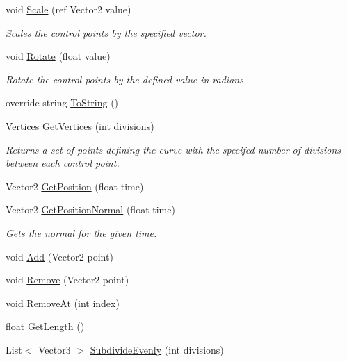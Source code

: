 \begin{DoxyCompactItemize}
void \hyperlink{class_farseer_physics_1_1_common_1_1_path_a33ade4f8312c0561d14ca16449e59cd4}{Scale} (ref Vector2 value)
\begin{DoxyCompactList}\small\item\em Scales the control points by the specified vector. \end{DoxyCompactList}\item 
void \hyperlink{class_farseer_physics_1_1_common_1_1_path_a5f4628f5869db71b8c36e6fa846536e2}{Rotate} (float value)
\begin{DoxyCompactList}\small\item\em Rotate the control points by the defined value in radians. \end{DoxyCompactList}\item 
override string \hyperlink{class_farseer_physics_1_1_common_1_1_path_a61b202f0d4f302a73d1508432c6bfa0f}{To\+String} ()
\item 
\hyperlink{class_farseer_physics_1_1_common_1_1_vertices}{Vertices} \hyperlink{class_farseer_physics_1_1_common_1_1_path_a20584c8b2eb6962d4685c7d1595faaec}{Get\+Vertices} (int divisions)
\begin{DoxyCompactList}\small\item\em Returns a set of points defining the curve with the specifed number of divisions between each control point. \end{DoxyCompactList}\item 
Vector2 \hyperlink{class_farseer_physics_1_1_common_1_1_path_afe45b457dcc1028fa00f4f2c64a3b2b5}{Get\+Position} (float time)
\item 
Vector2 \hyperlink{class_farseer_physics_1_1_common_1_1_path_a7a0612ba828150f7cbc65d18345411fe}{Get\+Position\+Normal} (float time)
\begin{DoxyCompactList}\small\item\em Gets the normal for the given time. \end{DoxyCompactList}\item 
void \hyperlink{class_farseer_physics_1_1_common_1_1_path_a0bb269a75a6d9032ceaed3e4f333318b}{Add} (Vector2 point)
\item 
void \hyperlink{class_farseer_physics_1_1_common_1_1_path_ae064a831d128bdd12dcc0e9c21db49cb}{Remove} (Vector2 point)
\item 
void \hyperlink{class_farseer_physics_1_1_common_1_1_path_a72616643f115ee1286522ec1b485c3dd}{Remove\+At} (int index)
\item 
float \hyperlink{class_farseer_physics_1_1_common_1_1_path_a22a0f5c0fbb4179e8490311ec46b1e00}{Get\+Length} ()
\item 
List$<$ Vector3 $>$ \hyperlink{class_farseer_physics_1_1_common_1_1_path_a1655182357fd942a3c45baf20d8d15b2}{Subdivide\+Evenly} (int divisions)
\end{DoxyCompactItemize}
